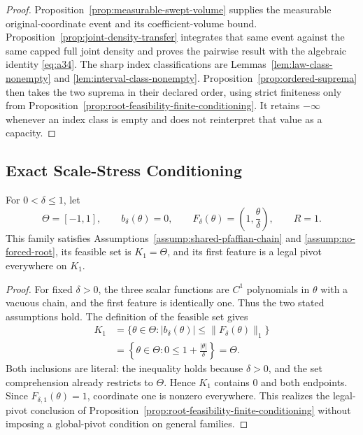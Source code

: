 \begin{proof}
Proposition~\ref{prop:measurable-swept-volume} supplies the measurable
original-coordinate event and its coefficient-volume bound.
Proposition~\ref{prop:joint-density-transfer} integrates that same event
against the same capped full joint density and proves the pairwise result
with the algebraic identity \eqref{eq:a34}.  The sharp index classifications
are Lemmas~\ref{lem:law-class-nonempty} and
\ref{lem:interval-class-nonempty}.  Proposition~\ref{prop:ordered-suprema}
then takes the two suprema in their declared order, using strict finiteness
only from Proposition~\ref{prop:root-feasibility-finite-conditioning}.
It retains $-\infty$ whenever an index class is empty and does not reinterpret
that value as a capacity.
\end{proof}

\subsection{Exact Scale-Stress Conditioning}

\begin{lemma}
\label{lem:scale-root-feasible}
For $0<\delta\leq1$, let
\[
\Theta=[-1,1],
\qquad b_\delta(\theta)=0,
\qquad F_\delta(\theta)=\left(1,\frac\theta\delta\right),
\qquad R=1.
\]
This family satisfies Assumptions~\ref{assump:shared-pfaffian-chain} and
\ref{assump:no-forced-root}, its feasible set is $K_1=\Theta$, and its
first feature is a legal pivot everywhere on $K_1$.
\end{lemma}

\begin{proof}
For fixed $\delta>0$, the three scalar functions are $C^1$ polynomials in
$\theta$ with a vacuous chain, and the first feature is identically one.
Thus the two stated assumptions hold.  The definition of the feasible set
gives
\[
\begin{aligned}
K_1
&=\{\theta\in\Theta:
 |b_\delta(\theta)|\leq\|F_\delta(\theta)\|_1\}\\
&=\left\{\theta\in\Theta:
 0\leq1+\frac{|\theta|}{\delta}\right\}=\Theta.
\end{aligned}
\tag{A44}\label{eq:a44}
\]
Both inclusions are literal: the inequality holds because $\delta>0$, and
the set comprehension already restricts to $\Theta$.  Hence $K_1$ contains
$0$ and both endpoints.  Since $F_{\delta,1}(\theta)=1$, coordinate one is
nonzero everywhere.  This realizes the legal-pivot conclusion of
Proposition~\ref{prop:root-feasibility-finite-conditioning} without imposing
a global-pivot condition on general families.
\end{proof}

